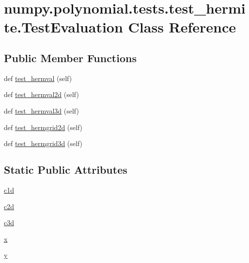 \hypertarget{classnumpy_1_1polynomial_1_1tests_1_1test__hermite_1_1TestEvaluation}{}\section{numpy.\+polynomial.\+tests.\+test\+\_\+hermite.\+Test\+Evaluation Class Reference}
\label{classnumpy_1_1polynomial_1_1tests_1_1test__hermite_1_1TestEvaluation}
\subsection*{Public Member Functions}
\begin{DoxyCompactItemize}
\item 
def \hyperlink{classnumpy_1_1polynomial_1_1tests_1_1test__hermite_1_1TestEvaluation_a428a4cec4b4c35329c48596a486bbecd}{test\+\_\+hermval} (self)
\item 
def \hyperlink{classnumpy_1_1polynomial_1_1tests_1_1test__hermite_1_1TestEvaluation_a0b80e3da728a60f9f5546611eb04210d}{test\+\_\+hermval2d} (self)
\item 
def \hyperlink{classnumpy_1_1polynomial_1_1tests_1_1test__hermite_1_1TestEvaluation_a75c450b9ba25a6166ad1b2ef2dcbc51f}{test\+\_\+hermval3d} (self)
\item 
def \hyperlink{classnumpy_1_1polynomial_1_1tests_1_1test__hermite_1_1TestEvaluation_a927fa6164aa40437db9322a21b88c839}{test\+\_\+hermgrid2d} (self)
\item 
def \hyperlink{classnumpy_1_1polynomial_1_1tests_1_1test__hermite_1_1TestEvaluation_a53eaa7b78f9508b6426376498eaa81e0}{test\+\_\+hermgrid3d} (self)
\end{DoxyCompactItemize}
\subsection*{Static Public Attributes}
\begin{DoxyCompactItemize}
\item 
\hyperlink{classnumpy_1_1polynomial_1_1tests_1_1test__hermite_1_1TestEvaluation_a46c7a1912749ccc81585440e56e9bc1a}{c1d}
\item 
\hyperlink{classnumpy_1_1polynomial_1_1tests_1_1test__hermite_1_1TestEvaluation_a5837414ac50f9251c1f6d689352c1b2d}{c2d}
\item 
\hyperlink{classnumpy_1_1polynomial_1_1tests_1_1test__hermite_1_1TestEvaluation_ae6317f80c40e837a684d95432d862bf3}{c3d}
\item 
\hyperlink{classnumpy_1_1polynomial_1_1tests_1_1test__hermite_1_1TestEvaluation_abec7a726ffd0d300a582717c9be9939f}{x}
\item 
\hyperlink{classnumpy_1_1polynomial_1_1tests_1_1test__hermite_1_1TestEvaluation_a1594efc87402576cfbda74079f727494}{y}
\end{DoxyCompactItemize}


